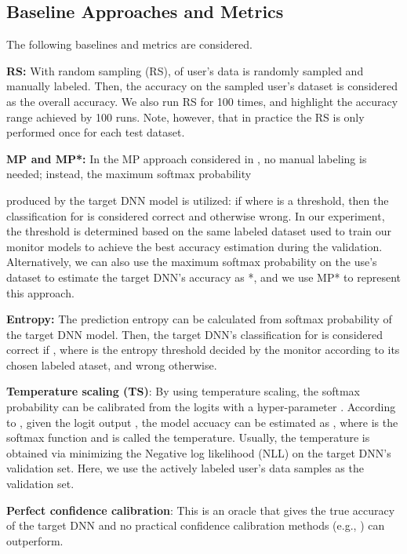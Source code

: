 \documentclass{article}
\begin{document}
\subsection{Baseline Approaches and Metrics}
The following baselines and metrics are considered.

\textbf{RS:} With random sampling (RS),  of user's data is  randomly sampled and manually labeled. Then, the accuracy on the sampled user's dataset is considered as the overall accuracy.
We also run RS for 100 times, and highlight the  accuracy range achieved by 100 runs. Note, however, that in practice the RS is only performed {once} for each test dataset.

\textbf{MP and MP*:} In the MP approach considered
in \cite{DNN_Uncertainty_Baseline_OOD_ICLR_2017}, no manual
labeling is needed; instead,
the maximum softmax probability

produced by the target DNN model
is utilized: if 
where  is a threshold, then the classification for  is considered correct and otherwise wrong.
In our experiment, the threshold  is determined
based on the same labeled dataset used to train our monitor models
to achieve the best accuracy estimation during the validation.
Alternatively, we can also use the maximum softmax probability
on the use's dataset to estimate the target DNN's accuracy as
*, and we use MP* to represent
this approach.

\textbf{Entropy:} The prediction entropy  can be calculated from softmax probability of the target DNN model. Then, the target DNN's classification for  is considered correct if , where  is the entropy threshold decided by the monitor according
to its chosen labeled ataset, and wrong otherwise.

\textbf{Temperature scaling (TS)}: By using temperature scaling, the softmax probability can be calibrated from the logits  with a hyper-parameter . According to \cite{DNN_Calibration_TemperatureScaling_ICML_2017_calibration_guo_2017}, given the logit output , the model accuacy can be estimated as , where  is the softmax function and  is called the temperature. Usually, the temperature  is obtained via minimizing the Negative log likelihood (NLL) on the target
DNN's validation set. Here, we use the actively labeled
user's data samples as the validation set.

\textbf{Perfect confidence calibration}:
This is an oracle that gives the true accuracy of the target
DNN and no practical confidence calibration
methods (e.g., \cite{DNN_Uncertainty_PostHoc_Dirichlet_NIPS_2019_kull2019beyond}) can outperform.
\end{document}
